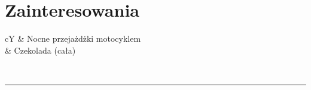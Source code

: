 \documentclass[oneside]{article}
\begin{document}
{\begin{minipage}[t][\dimexpr\textheight-2\fboxrule-2\fboxsep\relax][t]{\dimexpr0.4\textwidth-2\fboxrule-2\fboxsep\relax}
        \section*{\large Zainteresowania}
        \begin{tabularx}{\textwidth}{cY}
            \faMotorcycle{} & Nocne przejażdżki motocyklem \\
            \faCookieBite{} & Czekolada (cała) \\
        \end{tabularx}
        \vspace{.3cm}
        \\
        \rule{\linewidth}{0.4pt}
    \end{minipage}%
}%
\end{document}
